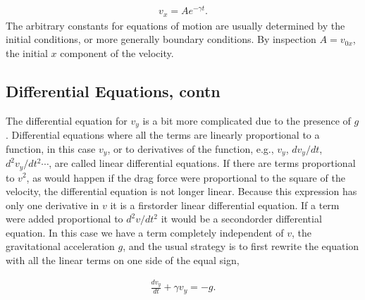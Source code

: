 \documentclass[letterpaper,10pt,english]{sphinxmanual}
\begin{document}
\begin{equation*}
\begin{split}
\begin{equation}
v_x=Ae^{-\gamma t}.
\label{_auto5} \tag{5}
\end{equation}
\end{split}
\end{equation*}
The arbitrary constants for equations of motion are usually determined
by the initial conditions, or more generally boundary conditions. By
inspection \(A=v_{0x}\), the initial \(x\) component of the velocity.


\subsection{Differential Equations, contn}
\label{\detokenize{chapter2:differential-equations-contn}}
The differential equation for \(v_y\) is a bit more complicated due to
the presence of \(g\). Differential equations where all the terms are
linearly proportional to a function, in this case \(v_y\), or to
derivatives of the function, e.g., \(v_y\), \(dv_y/dt\),
\(d^2v_y/dt^2\cdots\), are called linear differential equations. If
there are terms proportional to \(v^2\), as would happen if the drag
force were proportional to the square of the velocity, the
differential equation is not longer linear. Because this expression
has only one derivative in \(v\) it is a first\sphinxhyphen{}order linear differential
equation. If a term were added proportional to \(d^2v/dt^2\) it would be
a second\sphinxhyphen{}order differential equation.  In this case we have a term
completely independent of \(v\), the gravitational acceleration \(g\), and
the usual strategy is to first rewrite the equation with all the
linear terms on one side of the equal sign,




\begin{equation*}
\begin{split}
\begin{equation}
\frac{dv_y}{dt}+\gamma v_y=-g.
\label{_auto6} \tag{6}
\end{equation}
\end{split}
\end{equation*}
\end{document}
